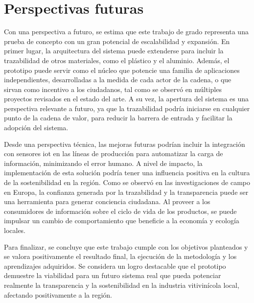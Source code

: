 \section{Perspectivas futuras}

Con una perspectiva a futuro, se estima que este trabajo de grado representa una prueba de concepto con un gran potencial de escalabilidad y expansión. En primer lugar, la arquitectura del sistema puede extenderse para incluir la trazabilidad de otros materiales, como el plástico y el aluminio. Además, el prototipo puede servir como el núcleo que potencie una familia de aplicaciones independientes, desarrolladas a la medida de cada actor de la cadena, o que sirvan como incentivo a los ciudadanos, tal como se observó en múltiples proyectos revisados en el estado del arte. A su vez, la apertura del sistema es una perspectiva relevante a futuro, ya que la trazabilidad podría iniciarse en cualquier punto de la cadena de valor, para reducir la barrera de entrada y facilitar la adopción del sistema.

Desde una perspectiva técnica, las mejoras futuras podrían incluir la integración con sensores \gls{iot} en las líneas de producción para automatizar la carga de información, minimizando el error humano. A nivel de impacto, la implementación de esta solución podría tener una influencia positiva en la cultura de la sostenibilidad en la región. Como se observó en las investigaciones de campo en Europa, la confianza generada por la trazabilidad y la transparencia puede ser una herramienta para generar conciencia ciudadana. Al proveer a los consumidores de información sobre el ciclo de vida de los productos, se puede impulsar un cambio de comportamiento que beneficie a la economía y ecología locales.

Para finalizar, se concluye que este trabajo cumple con los objetivos planteados y se valora positivamente el resultado final, la ejecución de la metodología y los aprendizajes adquiridos. Se considera un logro destacable que el prototipo demuestre la viabilidad para un futuro sistema real que pueda potenciar realmente la transparencia y la sostenibilidad en la industria vitivinícola local, afectando positivamente a la región.
